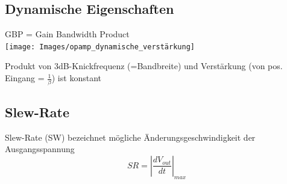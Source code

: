 \subsection{Dynamische Eigenschaften}
GBP = Gain Bandwidth Product\\
\texttt{[image: Images/opamp\_dynamische\_verstärkung]}

Produkt von 3dB-Knickfrequenz (=Bandbreite) und Verstärkung (von pos. Eingang = $\frac{1}{\beta}$) ist konstant

\subsection{Slew-Rate}
Slew-Rate (SW) bezeichnet mögliche Änderungsgeschwindigkeit der Ausgangsspannung
\[
SR = \left|\frac{dV_{out}}{dt}\right|_{max}
\]

